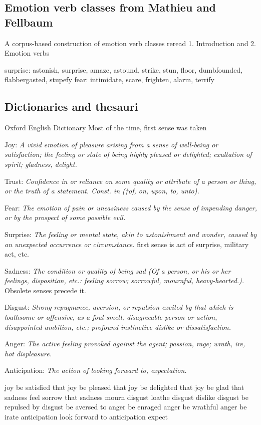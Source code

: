 \subsection{Emotion verb classes from Mathieu and Fellbaum}
A corpus-based construction of emotion verb classes
reread 1. Introduction and 2. Emotion verbs

surprise: astonish, surprise, amaze, astound, strike, stun, floor, dumbfounded, flabbergasted, stupefy
fear: intimidate, scare, frighten, alarm, terrify



\subsection{Dictionaries and thesauri}

Oxford English Dictionary
Most of the time, first sense was taken 
\begin{list}{•}{•}
	\item Joy: \textit{A vivid emotion of pleasure arising from a sense of well-being or satisfaction; the feeling or state of being highly pleased or delighted; exultation of spirit; gladness, delight.}
	\item Trust: \textit{Confidence in or reliance on some quality or attribute of a person or thing, or the truth of a statement. Const. in (†of, on, upon, to, unto).}
	\item Fear: \textit{The emotion of pain or uneasiness caused by the sense of impending danger, or by the prospect of some possible evil.}
	\item Surprise: \textit{The feeling or mental state, akin to astonishment and wonder, caused by an unexpected occurrence or circumstance.} first sense is act of surprise, military act, etc.
	\item Sadness: \textit{The condition or quality of being sad (Of a person, or his or her feelings, disposition, etc.: feeling sorrow; sorrowful, mournful, heavy-hearted.).} Obsolete senses precede it.
	\item Disgust: \textit{Strong repugnance, aversion, or repulsion excited by that which is loathsome or offensive, as a foul smell, disagreeable person or action, disappointed ambition, etc.; profound instinctive dislike or dissatisfaction.}
	\item Anger: \textit{The active feeling provoked against the agent; passion, rage; wrath, ire, hot displeasure.}
	\item Anticipation: \textit{The action of looking forward to, expectation.}
\end{list}
joy	be satisfied that
joy	be pleased that
joy	be delighted that
joy	be glad that
sadness	feel sorrow that
sadness mourn
disgust	loathe
disgust dislike
disgust be repulsed by
disgust be aversed to
anger	be enraged
anger	be wrathful
anger	be irate
anticipation	look forward to
anticipation expect


